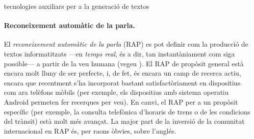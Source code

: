 \begin{persabermes}{tecnologies auxiliars per a la generació de textos}
  \paragraph{Reconeixement automàtic de la parla.}
  El \emph{reconeixement automàtic de la parla} (RAP) es pot definir
  com la producció de textos informatitzats ---en \emph{temps real},
  és a dir, tan instantàniament com siga possible--- a partir de la
  veu humana (vegeu \citealt{samuelson-brown96b}). El RAP de propòsit
  general està encara molt lluny de ser perfecte, i, de fet, és encara
  un camp de recerca actiu, encara que recentment s'ha incorporat
  bastant satisfactòriament en dispositius com ara telèfons
  mòbils (per exemple, els dispositius amb sistema operatiu Android
    permeten fer recerques per veu). En canvi, el RAP per a un
  propòsit específic (per exemple, la consulta telefònica d'horaris de
  trens o de les condicions del trànsit) està molt més avançat. La
  major part de la inversió de la comunitat internacional en RAP és,
  per raons òbvies, sobre l'anglés.


\end{persabermes}
